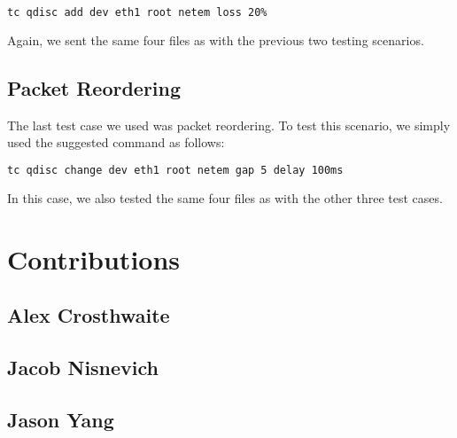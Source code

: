 \documentclass{article}
\begin{document}
\begin{lstlisting}[language=bash]
tc qdisc add dev eth1 root netem loss 20%
\end{lstlisting}

\noindent
Again, we sent the same four files as with the previous two testing scenarios.

\subsection{Packet Reordering}

The last test case we used was packet reordering. To test this scenario, we simply used the suggested command as follows:

\begin{lstlisting}[language=bash]
tc qdisc change dev eth1 root netem gap 5 delay 100ms
\end{lstlisting}

\noindent
In this case, we also tested the same four files as with the other three test cases.

\section{Contributions}

\subsection{Alex Crosthwaite}

\subsection{Jacob Nisnevich}

\subsection{Jason Yang}
\end{document}
